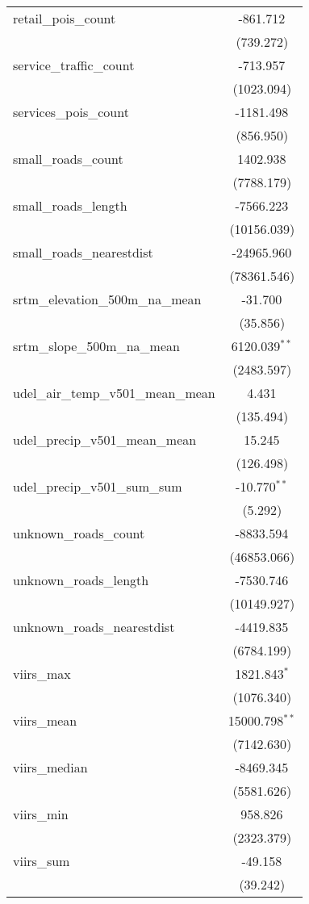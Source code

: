 \begin{table}[!htbp]
\begin{tabular}{@{\extracolsep{5pt}}lc}
 retail_pois_count & -861.712$^{}$ \\
  & (739.272) \\
 service_traffic_count & -713.957$^{}$ \\
  & (1023.094) \\
 services_pois_count & -1181.498$^{}$ \\
  & (856.950) \\
 small_roads_count & 1402.938$^{}$ \\
  & (7788.179) \\
 small_roads_length & -7566.223$^{}$ \\
  & (10156.039) \\
 small_roads_nearestdist & -24965.960$^{}$ \\
  & (78361.546) \\
 srtm_elevation_500m_na_mean & -31.700$^{}$ \\
  & (35.856) \\
 srtm_slope_500m_na_mean & 6120.039$^{**}$ \\
  & (2483.597) \\
 udel_air_temp_v501_mean_mean & 4.431$^{}$ \\
  & (135.494) \\
 udel_precip_v501_mean_mean & 15.245$^{}$ \\
  & (126.498) \\
 udel_precip_v501_sum_sum & -10.770$^{**}$ \\
  & (5.292) \\
 unknown_roads_count & -8833.594$^{}$ \\
  & (46853.066) \\
 unknown_roads_length & -7530.746$^{}$ \\
  & (10149.927) \\
 unknown_roads_nearestdist & -4419.835$^{}$ \\
  & (6784.199) \\
 viirs_max & 1821.843$^{*}$ \\
  & (1076.340) \\
 viirs_mean & 15000.798$^{**}$ \\
  & (7142.630) \\
 viirs_median & -8469.345$^{}$ \\
  & (5581.626) \\
 viirs_min & 958.826$^{}$ \\
  & (2323.379) \\
 viirs_sum & -49.158$^{}$ \\
  & (39.242) \\

\end{tabular}
\end{table}
